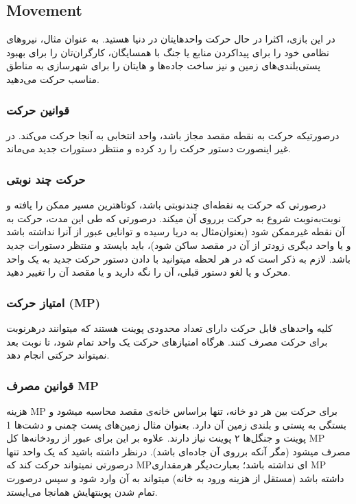 \documentclass[]{article}
\begin{document}
\subsection*{{\titr Movement}}
در این بازی، اکثرا در حال حرکت واحدهایتان در دنیا هستید. به عنوان‌ مثال، نیروهای نظامی خود را برای پیداکردن منابع یا جنگ با همسایگان، کارگران‌تان را برای بهبود پستی‌بلندی‌های زمین و نیز ساخت جاده‌ها و هایتان را برای شهرسازی به مناطق مناسب حرکت می‌دهید.

\subsubsection*{{\titr قوانین حرکت}}

درصورتیکه حرکت به نقطه مقصد مجاز باشد، واحد انتخابی به آنجا حرکت می‌کند. در غیر اینصورت دستور حركت را رد کرده و منتظر دستورات جدید می‌ماند.

\subsubsection*{{\titr حرکت چند نوبتی}}
درصورتی که حرکت به نقطه‌ای چندنوبتی باشد، کوتاهترین مسیر ممکن را یافته و نوبت‌به‌نوبت شروع به حرکت برروی آن میکند. درصورتی که طی این مدت، حرکت به آن نقطه غیرممکن شود (بعنوان‌مثال به دریا رسیده و توانایی عبور از آنرا نداشته باشد و یا واحد دیگری زودتر از آن در مقصد ساکن شود)، باید بایستد و منتظر دستورات جدید باشد. لازم به ذکر است که در هر لحظه میتوانید با دادن دستور حرکت جدید به یک واحد محرک و یا لغو دستور قبلی، آن را نگه دارید و یا مقصد آن را تغییر دهید.

\subsubsection*{{\titr امتیاز حرکت (MP) }}
کلیه واحد‌های قابل حرکت دارای تعداد محدودی پوینت هستند که میتوانند درهرنوبت برای حرکت مصرف کنند. هرگاه امتیازهای حرکت یک واحد تمام شود، تا نوبت بعد نمیتواند حرکتی انجام دهد.

\subsubsection*{{\titr قوانین مصرف MP}}
هزینه MP برای حرکت بین هر دو خانه، تنها براساس خانه‌ی مقصد محاسبه میشود و بستگی به پستی و بلندی زمین آن دارد. بعنوان مثال زمین‌های پست چمنی و دشت‌ها 1 پوینت و جنگل‌ها ۲ پوینت نیاز دارند. علاوه بر این برای عبور از رودخانه‌ها کل MP مصرف میشود (مگر آنکه برروی آن جاده‌ای باشد).
درنظر داشته باشید که یک واحد تنها درصورتی نمیتواند حرکت کند که MPای نداشته باشد؛ بعبارت‌دیگر هرمقداری MP داشته باشد (مستقل از هزینه ورود به خانه) میتواند به آن وارد شود و سپس درصورت تمام شدن پوینتهایش همانجا می‌ایستد.
\end{document}
